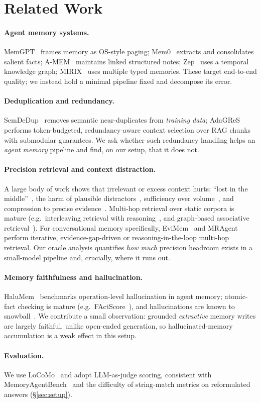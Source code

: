 \section{Related Work}

\paragraph{Agent memory systems.} MemGPT~\cite{packer2023memgpt} frames memory as
OS-style paging; Mem0~\cite{chhikara2025mem0} extracts and consolidates salient
facts; A-MEM~\cite{xu2025amem} maintains linked structured notes;
Zep~\cite{rasmussen2025zep} uses a temporal knowledge graph; MIRIX~\cite{wang2025mirix}
uses multiple typed memories. These target end-to-end quality; we instead hold a
minimal pipeline fixed and decompose its error.

\paragraph{Deduplication and redundancy.} SemDeDup~\cite{abbas2023semdedup}
removes semantic near-duplicates from \emph{training data};
AdaGReS~\cite{peng2025adagres} performs token-budgeted, redundancy-aware context
selection over RAG chunks with submodular guarantees. We ask whether such
redundancy handling helps an \emph{agent memory} pipeline and find, on our setup,
that it does not.

\paragraph{Precision retrieval and context distraction.} A large body of work
shows that irrelevant or excess context hurts: ``lost in the
middle''~\cite{liu2023lost}, the harm of plausible
distractors~\cite{cuconasu2024power}, sufficiency over
volume~\cite{joren2025sufficient}, and compression to precise
evidence~\cite{xu2024recomp}. Multi-hop retrieval over static corpora is mature (e.g.\ interleaving retrieval
with reasoning~\cite{trivedi2023ircot}, and graph-based associative
retrieval~\cite{gutierrez2024hipporag}). For conversational memory specifically,
EviMem~\cite{li2026evimem} and MRAgent~\cite{ji2026mragent} perform iterative,
evidence-gap-driven or reasoning-in-the-loop multi-hop retrieval. Our oracle
analysis quantifies \emph{how much} precision headroom exists in a small-model
pipeline and, crucially, where it runs out.

\paragraph{Memory faithfulness and hallucination.}
HaluMem~\cite{chen2025halumem} benchmarks operation-level hallucination in agent
memory; atomic-fact checking is mature (e.g.\
FActScore~\cite{min2023factscore}), and hallucinations are known to
snowball~\cite{zhang2023snowball}. We contribute a small observation: grounded
\emph{extractive} memory writes are largely faithful, unlike open-ended
generation, so hallucinated-memory accumulation is a weak effect in this setup.

\paragraph{Evaluation.} We use LoCoMo~\cite{maharana2024locomo} and adopt
LLM-as-judge scoring, consistent with
MemoryAgentBench~\cite{hu2025memoryagentbench} and the difficulty of string-match
metrics on reformulated answers (\S\ref{sec:setup}).
